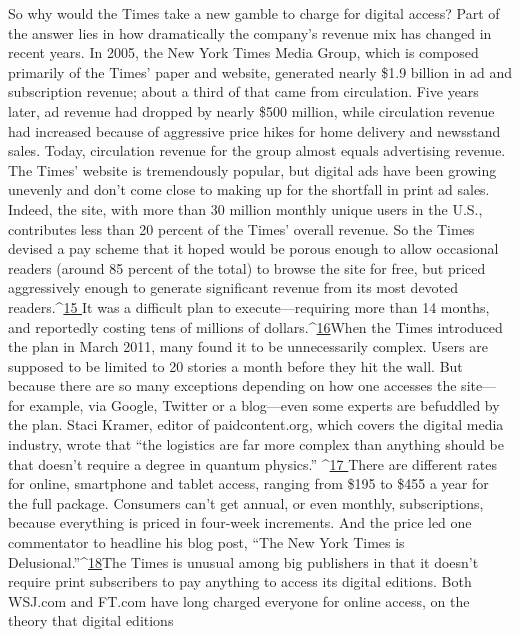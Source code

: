 So why would the Times take a new gamble to charge for digital access? Part
of the answer lies in how dramatically the company’s revenue mix has changed
in recent years.
In 2005, the New York Times Media Group, which is composed primarily of
the Times’ paper and website, generated nearly \$1.9 billion in ad and subscription
revenue; about a third of that came from circulation. Five years later, ad revenue
had dropped by nearly \$500 million, while circulation revenue had increased
because of aggressive price hikes for home delivery and newsstand sales. Today,
circulation revenue for the group almost equals advertising revenue.
The Times’ website is tremendously popular, but digital ads have been growing
unevenly and don’t come close to making up for the shortfall in print ad sales.
Indeed, the site, with more than 30 million monthly unique users in the U.S.,
contributes less than 20 percent of the Times’ overall revenue.
So the Times devised a pay scheme that it hoped would be porous enough to
allow occasional readers (around 85 percent of the total) to browse the site for
free, but priced aggressively enough to generate significant revenue from its most
devoted readers.^{\href{#endnotes-ch5}{15 }}It was a difficult plan to execute—requiring more than 14
months, and reportedly costing tens of millions of dollars.^{\href{#endnotes-ch5}{16}}When the Times introduced the plan in March 2011, many found it to be
unnecessarily complex. Users are supposed to be limited to 20 stories a month
before they hit the wall. But because there are so many exceptions depending
on how one accesses the site—for example, via Google, Twitter or a blog—even
some experts are befuddled by the plan. Staci Kramer, editor of paidcontent.org,
which covers the digital media industry, wrote that ``the logistics are far more
complex than anything should be that doesn’t require a degree in quantum physics.''
^{\href{#endnotes-ch5}{17 }}There are different rates for online, smartphone and tablet access, ranging
from \$195 to \$455 a year for the full package. Consumers can’t get annual, or
even monthly, subscriptions, because everything is priced in four-week increments.
And the price led one commentator to headline his blog post, ``The New
York Times is Delusional.''^{\href{#endnotes-ch5}{18}}The Times is unusual among big publishers in that it doesn’t require print subscribers
to pay anything to access its digital editions. Both WSJ.com and FT.com
have long charged everyone for online access, on the theory that digital editions
